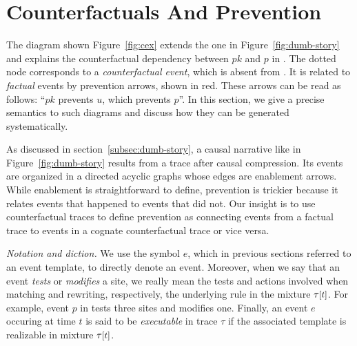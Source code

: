 
\section{Counterfactuals And Prevention}\label{sec:inhibition}




The diagram shown Figure~\ref{fig:cex} extends the one in
Figure~\ref{fig:dumb-story} and explains the counterfactual dependency
between $pk$ and $p$ in \RefTrace{}. The dotted node corresponds to a
\emph{counterfactual event}, which is absent from \RefTrace{}. It is
related to \emph{factual} events by prevention arrows, shown in
red. These arrows can be read as follows: ``$pk$ prevents $u$, which
prevents $p$''. In this section, we give a precise semantics to such
diagrams and discuss how they can be generated systematically.

As discussed in section~\ref{subsec:dumb-story}, a causal narrative like
in Figure~\ref{fig:dumb-story} results from a trace after causal
compression.  Its events are organized in a directed acyclic graphs whose edges
are enablement arrows. While enablement is straightforward to define, prevention
is trickier because it relates events that happened to events that did not. Our
insight is to use counterfactual traces to define prevention as connecting
events from a factual trace to events in a cognate counterfactual trace or vice
versa.


\ifshort \else \medskip \fi

\emph{Notation and diction.} We use
the symbol $e$, which in previous sections referred to an event
template, to directly denote an event. Moreover, when we say that an
event \emph{tests} or \emph{modifies} a site, we really mean the tests
and actions involved when matching and rewriting, respectively, the
underlying rule in the mixture $\TSTATE{t}{\tau}$. For example, event
$p$ in \RefTrace{} tests three sites and modifies one. Finally, an
event $e$ occuring at time $t$ is said to be \emph{executable} in
trace $\tau$ if the associated template is realizable in mixture
$\TSTATE{t}{\tau}$.

